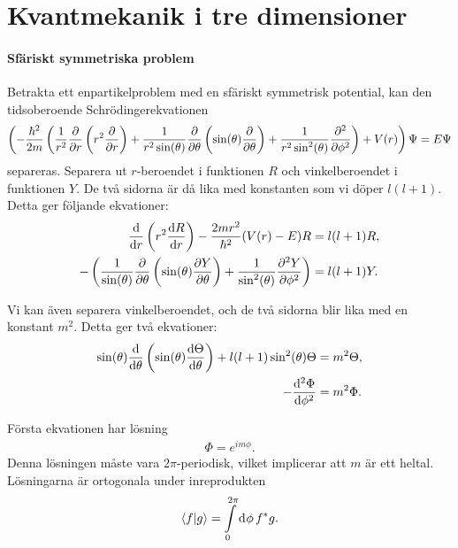 \section{Kvantmekanik i tre dimensioner}

\paragraph{Sfäriskt symmetriska problem}
Betrakta ett enpartikelproblem med en sfäriskt symmetrisk potential, kan den tidsoberoende Schrödingerekvationen
\begin{align*}
	\left(-\frac{\hbar^{2}}{2m}\left(\frac{1}{r^{2}}\pdv{r}\left(r^{2}\pdv{r}\right) + \frac{1}{r^{2}\sin(\theta)}\pdv{\theta}\left(\sin(\theta)\pdv{\theta}\right) + \frac{1}{r^{2}\sin^{2}(\theta)}\pdv[2]{\phi}\right) + V(r)\right)\Psi = E\Psi
\end{align*}
separeras. Separera ut $r$-beroendet i funktionen $R$ och vinkelberoendet i funktionen $Y$. De två sidorna är då lika med konstanten som vi döper $l(l + 1)$. Detta ger följande ekvationer:
\begin{align*}
	\dv{r}\left(r^{2}\dv{R}{r}\right) -\frac{2mr^{2}}{\hbar^{2}}(V(r) - E)R &= l(l + 1)R, \\
	- \left(\frac{1}{\sin(\theta)}\pdv{\theta}\left(\sin(\theta)\pdv{Y}{\theta}\right) + \frac{1}{\sin^{2}(\theta)}\pdv[2]{Y}{\phi}\right)                           &= l(l + 1)Y.
\end{align*}

Vi kan även separera vinkelberoendet, och de två sidorna blir lika med en konstant $m^{2}$. Detta ger två ekvationer:
\begin{align*}
	\sin(\theta)\dv{\theta}\left(\sin(\theta)\dv{\Theta}{\theta}\right) + l(l + 1)\sin[2](\theta)\Theta          &= m^{2}\Theta, \\
	-\dv[2]{\Phi}{\phi} &= m^{2}\Phi.
\end{align*}

Första ekvationen har lösning
\begin{align*}
	\Phi = e^{im\phi}.
\end{align*}
Denna lösningen måste vara $2\pi$-periodisk, vilket implicerar att $m$ är ett heltal. Lösningarna är ortogonala under inreprodukten
\begin{align*}
	\braket{f}{g} = \int\limits_{0}^{2\pi}\dd[]{\phi}f^{*}g.
\end{align*}


